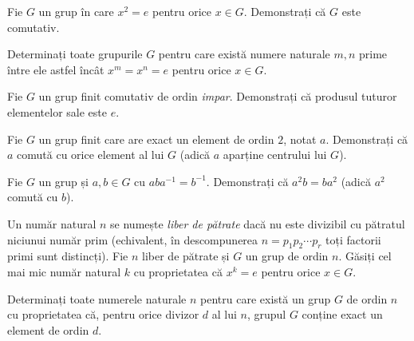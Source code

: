 
\setcounter{cat}{1}\setcounter{problemaX}{0}

\begin{problema}[Clasică]
Fie $G$ un grup în care $x^{2}=e$ pentru orice $x \in G$. Demonstrați
că $G$ este comutativ.
\end{problema}

\begin{problema}
Determinați toate grupurile $G$ pentru care există numere naturale
$m,n$ prime între ele astfel încât $x^{m}=x^{n}=e$ pentru orice
$x \in G$.
\end{problema}

\begin{problema}[Clasică]
Fie $G$ un grup finit comutativ de ordin \emph{impar}. Demonstrați că
produsul tuturor elementelor sale este $e$.
\end{problema}

\begin{problema}[Clasică]
Fie $G$ un grup finit care are exact un element de ordin $2$, notat $a$.
Demonstrați că $a$ comută cu orice element al lui $G$ (adică
$a$ aparține centrului lui $G$).
\end{problema}

\begin{problema}
Fie $G$ un grup și $a,b \in G$ cu $aba^{-1}=b^{-1}$. Demonstrați
că $a^{2}b = ba^{2}$ (adică $a^{2}$ comută cu $b$).
\end{problema}

\begin{problema}
Un număr natural $n$ se numește \emph{liber de pătrate} dacă
nu este divizibil cu pătratul niciunui număr prim (echivalent, în
descompunerea $n=p_{1}p_{2}\cdots p_{r}$ toți factorii primi sunt
distincți). Fie $n$ liber de pătrate și $G$ un grup de ordin
$n$. Găsiți cel mai mic număr natural $k$ cu proprietatea
că $x^{k}=e$ pentru orice $x \in G$.
\end{problema}

\begin{problema}
Determinați toate numerele naturale $n$ pentru care există un grup
$G$ de ordin $n$ cu proprietatea că, pentru orice divizor $d$ al lui
$n$, grupul $G$ conține exact un element de ordin $d$.
\end{problema}

